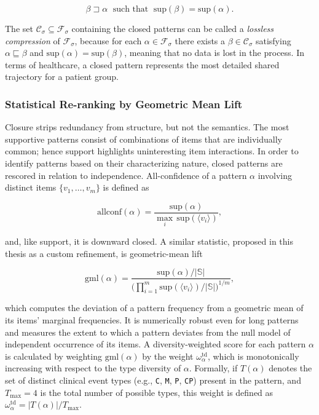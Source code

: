 \begin{equation}
    \beta \sqsupset \alpha \;\text{ such that }\; \mathrm{sup}(\beta) = \mathrm{sup}(\alpha).
    \label{eq:closed}
\end{equation}

The set $\mathcal{C}_\sigma \subseteq \mathcal{F}_\sigma$ containing the closed patterns can be called a \emph{lossless compression} of $\mathcal{F}_\sigma$, because for each $\alpha \in \mathcal{F}_\sigma$ there exists a $\beta \in \mathcal{C}_\sigma$ satisfying $\alpha \sqsubseteq \beta$ and $\mathrm{sup}(\alpha) = \mathrm{sup}(\beta)$, meaning that no data is lost in the process. In terms of healthcare, a closed pattern represents the most detailed shared trajectory for a patient group.

\subsubsection*{Statistical Re-ranking by Geometric Mean Lift}

Closure strips redundancy from structure, but not the semantics. The most supportive patterns consist of combinations of items that are individually common; hence support highlights uninteresting item interactions. In order to identify patterns based on their characterizing nature, closed patterns are rescored in relation to independence. All-confidence of a pattern $\alpha$ involving distinct items $\{v_1, \ldots, v_m\}$ \cite{omiecinski2003} is defined as

\begin{equation}
    \mathrm{allconf}(\alpha) = \frac{\mathrm{sup}(\alpha)}{\max_{i}\, \mathrm{sup}(\langle v_i \rangle)},
    \label{eq:allconf}
\end{equation}

and, like support, it is downward closed. A similar statistic, proposed in this thesis as a custom refinement, is geometric-mean lift

\begin{equation}
    \mathrm{gml}(\alpha) = \frac{\mathrm{sup}(\alpha)/|\mathbb{S}|}{\bigl(\prod_{i=1}^{m} \mathrm{sup}(\langle v_i \rangle)/|\mathbb{S}|\bigr)^{1/m}},
    \label{eq:gml}
\end{equation}

which computes the deviation of a pattern frequency from a geometric mean of its items' marginal frequencies. It is numerically robust even for long patterns and measures the extent to which a pattern deviates from the null model of independent occurrence of its items. A diversity-weighted score for each pattern $\alpha$ is calculated by weighting $\mathrm{gml}(\alpha)$ by the weight $\omega_\alpha^{\mathrm{td}}$, which is monotonically increasing with respect to the type diversity of $\alpha$. Formally, if $T(\alpha)$ denotes the set of distinct clinical event types (e.g., \texttt{C}, \texttt{M}, \texttt{P}, \texttt{CP}) present in the pattern, and $T_{\max} = 4$ is the total number of possible types, this weight is defined as $\omega_\alpha^{\mathrm{td}} = |T(\alpha)| / T_{\max}$.

